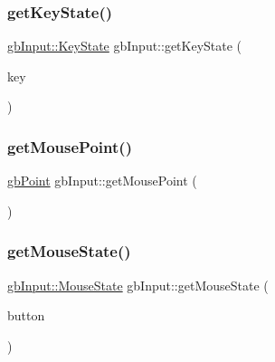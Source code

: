 \subsubsection{\texorpdfstring{getKeyState()}{getKeyState()}}
{\footnotesize\ttfamily \mbox{\hyperlink{classgb_input_af8c222f97119246c7b6e3c127a47a5bb}{gb\+Input\+::\+Key\+State}} gb\+Input\+::get\+Key\+State (\begin{DoxyParamCaption}\item[{S\+D\+L\+\_\+\+Keycode}]{key }\end{DoxyParamCaption})\hspace{0.3cm}{\ttfamily [static]}}

\mbox{\label{classgb_input_a4990717da115800069b6732bf1a084a8}} 
\subsubsection{\texorpdfstring{getMousePoint()}{getMousePoint()}}
{\footnotesize\ttfamily \mbox{\hyperlink{classgb_point}{gb\+Point}} gb\+Input\+::get\+Mouse\+Point (\begin{DoxyParamCaption}{ }\end{DoxyParamCaption})\hspace{0.3cm}{\ttfamily [static]}}

\mbox{\label{classgb_input_accf6fe3ece1c770b30c83644ff6b473d}} 
\subsubsection{\texorpdfstring{getMouseState()}{getMouseState()}}
{\footnotesize\ttfamily \mbox{\hyperlink{classgb_input_adf80e0206ecdf62ba8c55e9d5ac9c290}{gb\+Input\+::\+Mouse\+State}} gb\+Input\+::get\+Mouse\+State (\begin{DoxyParamCaption}\item[{\mbox{\hyperlink{classgb_input_a8b92d031046a9cc8e432684fae3ee398}{Mouse\+Button}}}]{button }\end{DoxyParamCaption})\hspace{0.3cm}{\ttfamily [static]}}

\mbox{\label{classgb_input_a1c1bd55741717af5ab438340da8d6856}} 
